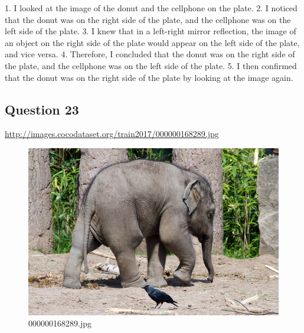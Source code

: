 \begin{enumerate}
        1. I looked at the image of the donut and the cellphone on the plate.
        2. I noticed that the donut was on the right side of the plate, and the cellphone was on the left side of the plate.
        3. I knew that in a left-right mirror reflection, the image of an object on the right side of the plate would appear on the left side of the plate, and vice versa.
        4. Therefore, I concluded that the donut was on the right side of the plate, and the cellphone was on the left side of the plate.
        5. I then confirmed that the donut was on the right side of the plate by looking at the image again.
    \end{enumerate}
\subsection*{Question 23}
\url{http://images.cocodataset.org/train2017/000000168289.jpg}
    \begin{figure}[h]
        \centering
        \includegraphics[width=0.8\linewidth]{../image set/easy/000000168289.jpg}
        \caption{000000168289.jpg}
    \end{figure}
